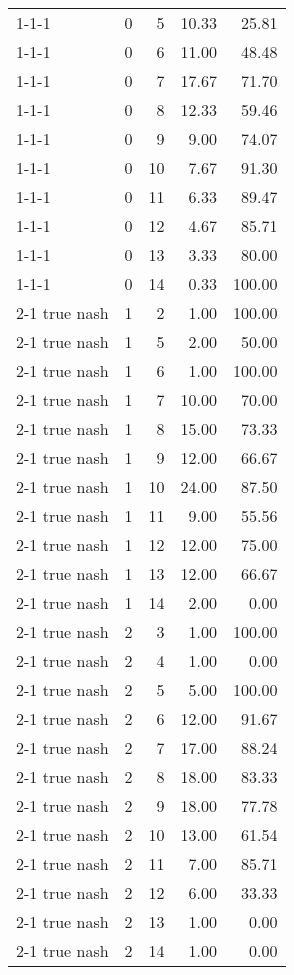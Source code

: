 \begin{tabular}{lrrrr}
1-1-1 & 0 & 5 & 10.33 & 25.81 \\
1-1-1 & 0 & 6 & 11.00 & 48.48 \\
1-1-1 & 0 & 7 & 17.67 & 71.70 \\
1-1-1 & 0 & 8 & 12.33 & 59.46 \\
1-1-1 & 0 & 9 & 9.00 & 74.07 \\
1-1-1 & 0 & 10 & 7.67 & 91.30 \\
1-1-1 & 0 & 11 & 6.33 & 89.47 \\
1-1-1 & 0 & 12 & 4.67 & 85.71 \\
1-1-1 & 0 & 13 & 3.33 & 80.00 \\
1-1-1 & 0 & 14 & 0.33 & 100.00 \\
2-1  true nash & 1 & 2 & 1.00 & 100.00 \\
2-1  true nash & 1 & 5 & 2.00 & 50.00 \\
2-1  true nash & 1 & 6 & 1.00 & 100.00 \\
2-1  true nash & 1 & 7 & 10.00 & 70.00 \\
2-1  true nash & 1 & 8 & 15.00 & 73.33 \\
2-1  true nash & 1 & 9 & 12.00 & 66.67 \\
2-1  true nash & 1 & 10 & 24.00 & 87.50 \\
2-1  true nash & 1 & 11 & 9.00 & 55.56 \\
2-1  true nash & 1 & 12 & 12.00 & 75.00 \\
2-1  true nash & 1 & 13 & 12.00 & 66.67 \\
2-1  true nash & 1 & 14 & 2.00 & 0.00 \\
2-1  true nash & 2 & 3 & 1.00 & 100.00 \\
2-1  true nash & 2 & 4 & 1.00 & 0.00 \\
2-1  true nash & 2 & 5 & 5.00 & 100.00 \\
2-1  true nash & 2 & 6 & 12.00 & 91.67 \\
2-1  true nash & 2 & 7 & 17.00 & 88.24 \\
2-1  true nash & 2 & 8 & 18.00 & 83.33 \\
2-1  true nash & 2 & 9 & 18.00 & 77.78 \\
2-1  true nash & 2 & 10 & 13.00 & 61.54 \\
2-1  true nash & 2 & 11 & 7.00 & 85.71 \\
2-1  true nash & 2 & 12 & 6.00 & 33.33 \\
2-1  true nash & 2 & 13 & 1.00 & 0.00 \\
2-1  true nash & 2 & 14 & 1.00 & 0.00 \\
\bottomrule
\end{tabular}
